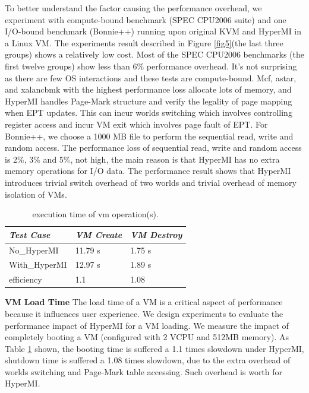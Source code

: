 \documentclass[conference]{IEEEtran}
\begin{document}
To better understand the factor causing the performance overhead, we experiment with compute-bound benchmark (SPEC CPU2006 suite) and one I/O-bound benchmark (Bonnie++) running upon original KVM and HyperMI in a Linux VM. The experiments result described in Figure \ref{fig5}(the last three groups) shows a relatively low cost. Most of the SPEC CPU2006 benchmarks (the first twelve groups) show less than 6\% performance overhead. It's not surprising as there are few OS interactions and these tests are compute-bound. Mcf, astar, and xalancbmk with the highest performance loss allocate lots of memory, and HyperMI handles Page-Mark structure and verify the legality of page mapping when EPT updates. This can incur worlds switching which involves controlling register access and incur VM exit which involves page fault of EPT.
 For Bonnie++, we choose a 1000 MB file to perform the sequential read, write and random access. The performance loss of sequential read, write and random access is 2\%, 3\% and 5\%, not high, the main reason is that HyperMI has no extra memory operations for I/O data. The performance result shows that HyperMI introduces trivial switch overhead of two worlds and trivial overhead of memory isolation of VMs.

\begin{table}
\centering
\caption{execution time of vm operation(s).}\label{tabvm}
\begin{tabular}{p{2cm}|p{1.4cm}|p{1.5cm}}
\hline
{\itshape\bfseries  Test Case} & {\itshape\bfseries VM Create} & {\itshape\bfseries VM Destroy} \\
\hline
No\_HyperMI & 11.79 s &  1.75 s\\
\hline
With\_HyperMI & 12.97 s & 1.89 s\\ 
\hline
efficiency & 1.1 & 1.08 \\
\hline
\end{tabular}
\end{table}


\textbf {VM Load Time}
The load time of a VM is a critical aspect of performance because it influences user experience. We design experiments to evaluate the performance impact of HyperMI for a VM loading.
 We measure the impact of completely booting a VM (configured with 2 VCPU and 512MB memory). As Table \ref{tabvm} shown, the booting time is suffered a 1.1 times slowdown under HyperMI, shutdown time is suffered a 1.08 times slowdown, due to the extra overhead of worlds switching and Page-Mark table accessing. Such overhead is worth for HyperMI.
\end{document}
